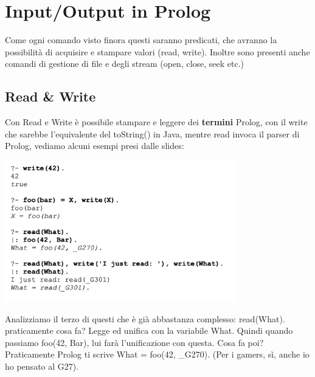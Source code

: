 \documentclass[12pt, a4paper, openany, oneside]{book}
\begin{document}
\chapter{Input/Output in Prolog}
Come ogni comando visto finora questi saranno predicati, che avranno la 
possibilità di acquisire e stampare valori (read, write). 
Inoltre sono presenti anche comandi di gestione di file e degli stream (open, 
close, seek etc.)
\section{Read \& Write}
Con Read e Write è possibile stampare e leggere dei \textbf{termini} Prolog,
con il write che sarebbe l'equivalente del toString() in Java, mentre read
invoca il parser di Prolog, vediamo alcuni esempi presi dalle slides:
\begin{center}
\includegraphics[width=0.75\textwidth]{esempi}
\end{center}
Analizziamo il terzo di questi che è già abbastanza complesso: 
read(What). praticamente cosa fa? Legge ed unifica con la variabile What. Quindi
quando passiamo foo(42, Bar), lui farà l'unificazione con questa. Cosa fa poi?
Praticamente Prolog ti scrive What = foo(42, \_G270). (Per i gamers, sì, anche
io ho pensato al G27).
\end{document}
